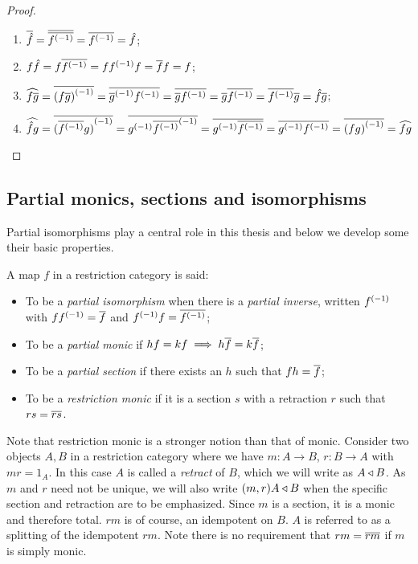\begin{proof}
  \prepprooflist
  \begin{enumerate}
    \item[\rrone] $\overline{\hat{f}} = \overline{\overline{{f}^{(-1)}}} = \overline{{f}^{(-1)}} = \hat{f}$;
    \item[\rrtwo] $f \hat{f} = f \overline{{f}^{(-1)}} = f {f}^{(-1)} f = \overline{f} f = f$;
    \item[\rrthree] $\widehat{f\overline{g}} = \overline{{(f\overline{g})}^{(-1)}} = \overline{{\overline{g}}^{(-1)} {f}^{(-1)}} =
      \overline{\overline{g} {f}^{(-1)}} =
      \overline{g} \overline{{f}^{(-1)}} = \overline{{f}^{(-1)}} \overline{g} =\hat{f} \overline{g}$;
    \item[\rrfour]  $\widehat{\hat{f}g} = \overline{{(\overline{{f}^{(-1)}} g)}^{(-1)}} =
      \overline{{g}^{(-1)}{\overline{{f}^{(-1)}}}^{(-1)}} = \overline{{g}^{(-1)} \overline{{f}^{(-1)}}} =
      \overline{{g}^{(-1)} {f}^{(-1)}} = \overline{{(f g)}^{(-1)}} = \widehat{f g}$
  \end{enumerate}
\end{proof}

\subsection{Partial monics, sections and isomorphisms} %
\label{sub:restricted_monics_sections_and_partial_isomorphisms}

Partial isomorphisms play a central role in this thesis and below we develop
some their basic properties.

\begin{definition}
  A map $f$ in a restriction category \X is said:
  \begin{itemize}
    \item To be a \emph{partial isomorphism} when there is a \emph{partial inverse}, written
      ${f}^{(-1)}$ with $f{f}^{(-1)} =\overline{f}$ and ${f}^{(-1)}f = \overline{{f}^{(-1)}}$;
    \item To be a \emph{partial monic} if $h f = k f \implies h \overline{f} = k \overline{f}$;
    \item To be a \emph{partial section} if there exists an  $h$ such that $f h = \overline{f}$;
    \item To be a \emph{restriction monic} if it is a section $s$ with a retraction
      $r$ such that $r s = \overline{r s}$.
  \end{itemize}
\end{definition}

Note that restriction monic is a stronger notion than that of monic. Consider two objects $A, B$
in a restriction category where we have $m: A\to B$, $r:B \to A$ with $m r = 1_A$. In this case
$A$ is called a \emph{retract} of $B$, which we will write as $A\triangleleft B$. As $m$ and $r$ need
not be unique, we will also write $(m,r) A \triangleleft B$ when the specific section and retraction
are to be emphasized. Since $m$ is a section,
it is a monic and therefore total. $r m$ is of course, an idempotent on $B$. $A$ is referred to as
a splitting of the idempotent $r m$. Note there is no requirement that $r m = \overline{r m}$ if $m$ is
simply monic.

